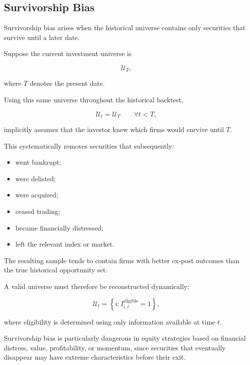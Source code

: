 \documentclass[11pt,a4paper]{article}
\begin{document}
\subsection{Survivorship Bias}
\label{subsec:survivorship_bias}

Survivorship bias arises when the historical universe contains only securities
that survive until a later date.

Suppose the current investment universe is

\begin{equation}
\mathcal{U}_{T},
\end{equation}

where $T$ denotes the present date.

Using this same universe throughout the historical backtest,

\begin{equation}
\mathcal{U}_t
=
\mathcal{U}_T
\qquad
\forall t<T,
\end{equation}

implicitly assumes that the investor knew which firms would survive until $T$.

This systematically removes securities that subsequently:

\begin{itemize}
    \item went bankrupt;
    \item were delisted;
    \item were acquired;
    \item ceased trading;
    \item became financially distressed;
    \item left the relevant index or market.
\end{itemize}

The resulting sample tends to contain firms with better ex-post outcomes than
the true historical opportunity set.

A valid universe must therefore be reconstructed dynamically:

\begin{equation}
\boxed{
\mathcal{U}_t
=
\left\{
i:
I_{i,t}^{\mathrm{eligible}}=1
\right\},
}
\end{equation}

where eligibility is determined using only information available at time $t$.

Survivorship bias is particularly dangerous in equity strategies based on
financial distress, value, profitability, or momentum, since securities that
eventually disappear may have extreme characteristics before their exit.
\end{document}
